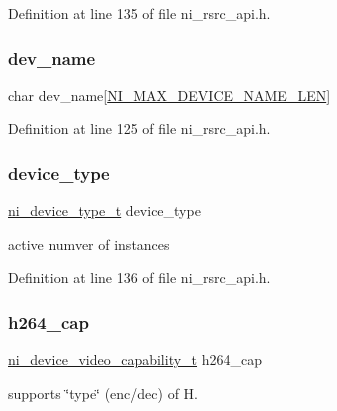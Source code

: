 Definition at line 135 of file ni\+\_\+rsrc\+\_\+api.\+h.

\mbox{\label{struct__ni__device__info_a5bddd902bffa71cca77922ac8e58f9dd}} 
\subsubsection{\texorpdfstring{dev\_name}{dev\_name}}
{\footnotesize\ttfamily char dev\+\_\+name\mbox{[}\mbox{\hyperlink{ni__rsrc__api_8h_a38deaa045e5ce61a183c8ceddc618d7e}{N\+I\+\_\+\+M\+A\+X\+\_\+\+D\+E\+V\+I\+C\+E\+\_\+\+N\+A\+M\+E\+\_\+\+L\+EN}}\mbox{]}}



Definition at line 125 of file ni\+\_\+rsrc\+\_\+api.\+h.

\mbox{\label{struct__ni__device__info_a7c83c99b4f3f7039be4f7e92f610c179}} 
\subsubsection{\texorpdfstring{device\_type}{device\_type}}
{\footnotesize\ttfamily \mbox{\hyperlink{ni__defs_8h_a758f24acb02b236820c7390eed53d1cc}{ni\+\_\+device\+\_\+type\+\_\+t}} device\+\_\+type}

active numver of instances 

Definition at line 136 of file ni\+\_\+rsrc\+\_\+api.\+h.

\mbox{\label{struct__ni__device__info_a6ad91fe8a36dc0e3637172ee67ad9885}} 
\subsubsection{\texorpdfstring{h264\_cap}{h264\_cap}}
{\footnotesize\ttfamily \mbox{\hyperlink{ni__rsrc__api_8h_adf4d30f539dbb9bae2cdf26a53baafeb}{ni\+\_\+device\+\_\+video\+\_\+capability\+\_\+t}} h264\+\_\+cap}

supports \char`\"{}type\char`\"{} (enc/dec) of H. 

